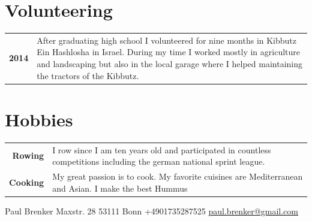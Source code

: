 \documentclass{modernsimplecv}
\newlength{\rightcolwidth}
\newlength{\leftcolwidth}
\begin{document}
\begin{paracol}{2}
\begin{minipage}[t]{\leftcolwidth}
  \end{minipage}\hfill






\vspace{2em}


\begin{minipage}[t]{\rightcolwidth}
\section*{Volunteering}
\begin{tabular}{>{\small\bfseries}r >{\small}p{}}
    2014 & After graduating high school I volunteered for nine months in Kibbutz Ein Hashlosha in Israel. During my time I worked mostly in agriculture and landscaping but also in the local garage where I helped maintaining the tractors of the Kibbutz. \\
    
\end{tabular}
\bigskip

\section*{Hobbies}
\begin{tabular}{>{\small\bfseries}r >{\small}p{}}
    Rowing & I row since I am ten years old and participated in countless competitions including the german national sprint league. \\
    Cooking & My great passion is to cook. My favorite cuisines are Mediterranean and Asian. I make the best Hummus
\end{tabular}
\end{minipage}









\end{paracol}

\vfill{} %

\setlength{\parindent}{0pt}
\begin{minipage}[t]{\textwidth}
\begin{center}\fontfamily{\sfdefault}\selectfont \color{black!70}
{\small Paul Brenker  Maxstr. 28  53111 Bonn  +4901735287525 
 \protect\url{paul.brenker@gmail.com}
}
\end{center}
\end{minipage}
\end{document}
